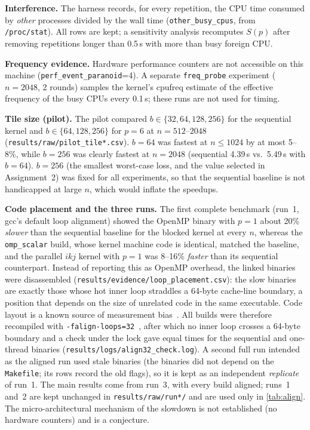 \documentclass[conference,a4paper]{IEEEtran}
\begin{document}
\textbf{Interference.} The harness records, for every repetition, the CPU time consumed by \emph{other}
processes divided by the wall time (\texttt{other\_busy\_cpus}, from \texttt{/proc/stat}). All rows are
kept; a sensitivity analysis recomputes $S(p)$ after removing repetitions longer than 0.5\,s with more
than \ContaminationThreshold{} busy foreign CPU.

\textbf{Frequency evidence.} Hardware performance counters are not accessible on this machine
(\texttt{perf\_event\_paranoid}=4). A separate \texttt{freq\_probe} experiment ($n=2048$, 2 rounds) samples
the kernel's cpufreq estimate of the effective frequency of the busy CPUs every 0.1\,s; these runs are
not used for timing.

\textbf{Tile size (pilot).} The pilot compared $b\in\{32,64,128,256\}$ for the sequential kernel and
$b\in\{64,128,256\}$ for $p=6$ at $n=512$--$2048$ (\texttt{results/raw/pilot\_tile*.csv}). $b=64$ was
fastest at $n\le1024$ by at most 5--8\%, while $b=256$ was clearly fastest at $n=2048$ (sequential
4.39\,s vs.\ 5.49\,s with $b=64$). $b=256$ (the smallest worst-case loss, and the value selected in
Assignment~2) was fixed for all experiments, so that the sequential baseline is not handicapped at
large $n$, which would inflate the speedups.

\textbf{Code placement and the three runs.} The first complete benchmark (run~1, gcc's default loop
alignment) showed the OpenMP binary with $p=1$ about 20\% \emph{slower} than the sequential baseline for
the blocked kernel at every $n$, whereas the \texttt{omp\_scalar} build, whose kernel machine code is
identical, matched the baseline, and the parallel $ikj$ kernel with $p=1$ was 8--16\% \emph{faster} than
its sequential counterpart. Instead of reporting this as OpenMP overhead, the linked binaries were
disassembled (\texttt{results/evidence/loop\_placement.csv}): the slow binaries are exactly those whose
hot inner loop straddles a 64-byte cache-line boundary, a position that depends on the size of unrelated
code in the same executable. Code layout is a known source of measurement bias~\cite{mytkowicz2009}.
All builds were therefore recompiled with \texttt{-falign-loops=32}~\cite{gccopt13}, after which no inner
loop crosses a 64-byte boundary and a check under the lock gave equal times for the sequential and
one-thread binaries (\texttt{results/logs/align32\_check.log}). A second full run intended as the aligned
run used stale binaries (the binaries did not depend on the \texttt{Makefile}; its rows record the old
flags), so it is kept as an independent \emph{replicate} of run~1. The main results come from run~3, with
every build aligned; runs~1 and~2 are kept unchanged in \texttt{results/raw/run*/} and are used only in
\cref{tab:align}. The micro-architectural mechanism of the slowdown is not established (no hardware
counters) and is a conjecture.
\end{document}
